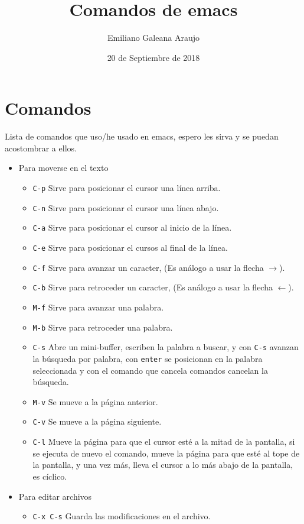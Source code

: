 \documentclass[spanish,12pt,letterpaper]{article}
\title{Comandos de emacs}
\author{Emiliano Galeana Araujo}
\affil{Facultad de Ciencias, UNAM}
\date{20 de Septiembre de 2018}
\begin{document}
\maketitle

\section{Comandos}
Lista de comandos que uso/he usado en emacs, espero les sirva y se puedan
acostombrar a ellos. 
\begin{itemize}
\item Para moverse en el texto
  \begin{itemize}
  \item \texttt{C-p} Sirve para posicionar el cursor una línea arriba.
  \item \texttt{C-n} Sirve para posicionar el cursor una línea abajo.
  \item \texttt{C-a} Sirve para posicionar el cursor al inicio de la línea.
  \item \texttt{C-e} Sirve para posicionar el cursos al final de la línea.
  \item \texttt{C-f} Sirve para avanzar un caracter, (Es análogo a usar la
    flecha $\rightarrow$).
  \item \texttt{C-b} Sirve para retroceder un caracter, (Es análogo a usar la
    flecha $\leftarrow$).
  \item \texttt{M-f} Sirve para avanzar una palabra.
  \item \texttt{M-b} Sirve para retroceder una palabra.
  \item \texttt{C-s} Abre un mini-buffer, escriben la palabra a buscar, y con
    \texttt{C-s} avanzan la búsqueda por palabra, con \texttt{enter} se
    posicionan en la palabra seleccionada y con el comando que cancela comandos
    cancelan la búsqueda.
  \item \texttt{M-v} Se mueve a la página anterior.
  \item \texttt{C-v} Se mueve a la página siguiente.
  \item \texttt{C-l} Mueve la página para que el cursor esté a la mitad de la
    pantalla, si se ejecuta de nuevo el comando, mueve la página para que esté
    al tope de la pantalla, y una vez más, lleva el cursor a lo más abajo de la
    pantalla, es cíclico.
  \end{itemize}
\item Para editar archivos
  \begin{itemize}
  \item \texttt{C-x C-s} Guarda las modificaciones en el archivo.

\end{itemize}
\end{itemize}
\end{document}
